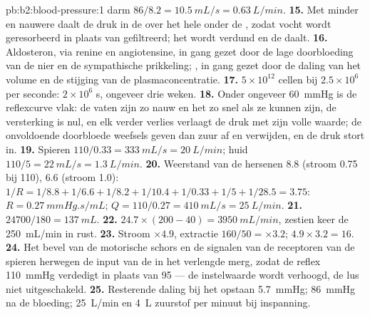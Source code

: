 \begin{solution}{pb:b2:blood-pressure:1}
darm $86/8.2 = \qty{10.5}{mL/s} = \qty{0.63}{L/min}$.
\textbf{15.} Met minder  en nauwere  daalt de druk in de
 over het hele  onder de , zodat vocht wordt
geresorbeerd in plaats van gefiltreerd; het  wordt verdund en de
 daalt.
\textbf{16.} Aldosteron, via renine en angiotensine, in gang gezet door de
lage doorbloeding van de nier en de sympathische prikkeling; , in gang gezet door de daling van het volume en de stijging van de
plasmaconcentratie.
\textbf{17.} $5\times 10^{12}$ cellen bij $2.5\times 10^{6}$ per seconde:
$2\times 10^{6}$ s, ongeveer drie weken.
\textbf{18.} Onder ongeveer \qty{60}{mmHg} is de reflexcurve vlak: de vaten
zijn zo nauw en het  zo snel als ze kunnen zijn, de versterking is nul,
en elk verder verlies verlaagt de druk met zijn volle waarde; de onvoldoende
doorbloede weefsels geven dan zuur af en verwijden, en de druk stort in.
\textbf{19.} Spieren $110/0.33 = \qty{333}{mL/s} = \qty{20}{L/min}$;
huid $110/5 = \qty{22}{mL/s} = \qty{1.3}{L/min}$.
\textbf{20.} Weerstand van de hersenen $8.8$ (stroom 0.75 bij 110),  $6.6$
(stroom 1.0): $1/R = 1/8.8 + 1/6.6 + 1/8.2 + 1/10.4 + 1/0.33 + 1/5 +
1/28.5 = 3.75$: $R = \qty{0.27}{mmHg.s/mL}$; $Q = 110/0.27 =
\qty{410}{mL/s} = \qty{25}{L/min}$.
\textbf{21.} $\num{24700}/180 = \qty{137}{mL}$.
\textbf{22.} $24.7\times(200 - 40) = \qty{3950}{mL/min}$, zestien keer de
\qty{250}{mL/min} in rust.
\textbf{23.} Stroom $\times 4.9$, extractie $160/50 = \times 3.2$;
$4.9\times 3.2 = 16$.
\textbf{24.} Het bevel van de motorische schors en de signalen van de
receptoren van de spieren herwegen de input van de  in het
verlengde merg, zodat de reflex \qty{110}{mmHg} verdedigt in plaats van 95
--- de instelwaarde wordt verhoogd, de lus niet uitgeschakeld.
\textbf{25.} Resterende daling bij het opstaan \qty{5.7}{mmHg}; \qty{86}{mmHg}
na de bloeding; \qty{25}{L/min} en \qty{4}{L} zuurstof per minuut bij
inspanning.
\end{solution}
